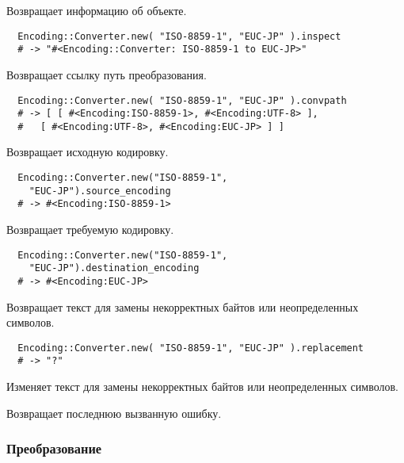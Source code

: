 \begin{methodlist}
  Возвращает информацию об объекте.
  \begin{verbatim}
  Encoding::Converter.new( "ISO-8859-1", "EUC-JP" ).inspect 
  # -> "#<Encoding::Converter: ISO-8859-1 to EUC-JP>"
  \end{verbatim} 
 
  Возвращает ссылку путь преобразования.
  \begin{verbatim}
  Encoding::Converter.new( "ISO-8859-1", "EUC-JP" ).convpath 
  # -> [ [ #<Encoding:ISO-8859-1>, #<Encoding:UTF-8> ],
  #   [ #<Encoding:UTF-8>, #<Encoding:EUC-JP> ] ]
  \end{verbatim}
 
  Возвращает исходную кодировку.
  \begin{verbatim}
  Encoding::Converter.new("ISO-8859-1",
    "EUC-JP").source_encoding 
  # -> #<Encoding:ISO-8859-1>
  \end{verbatim}
 
  Возвращает требуемую кодировку. 
  \begin{verbatim}
  Encoding::Converter.new("ISO-8859-1",
    "EUC-JP").destination_encoding 
  # -> #<Encoding:EUC-JP>
  \end{verbatim}

  Возвращает текст для замены некорректных байтов или неопределенных символов. 
  \begin{verbatim}
  Encoding::Converter.new( "ISO-8859-1", "EUC-JP" ).replacement
  # -> "?"
  \end{verbatim}
 
  Изменяет текст для замены некорректных байтов или неопределенных символов. 
 
  Возвращает последнюю вызванную ошибку.
\end{methodlist}

\subsubsection*{Преобразование}

